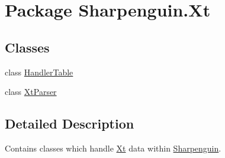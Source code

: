 \hypertarget{namespaceSharpenguin_1_1Xt}{\section{Package Sharpenguin.\-Xt}
\label{namespaceSharpenguin_1_1Xt}
}
\subsection*{Classes}
\begin{DoxyCompactItemize}
\item 
class \hyperlink{classSharpenguin_1_1Xt_1_1HandlerTable}{Handler\-Table}
\item 
class \hyperlink{classSharpenguin_1_1Xt_1_1XtParser}{Xt\-Parser}
\end{DoxyCompactItemize}


\subsection{Detailed Description}
Contains classes which handle \hyperlink{namespaceSharpenguin_1_1Xt}{Xt} data within \hyperlink{namespaceSharpenguin}{Sharpenguin}. 